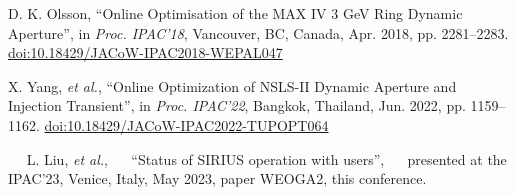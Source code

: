 \documentclass[a4paper,
               keeplastbox,   %
               ]{jacow}
\begin{document}
\begin{thebibliography}{9}
       D. K. Olsson,
       \textquotedblleft{Online Optimisation of the MAX IV 3 GeV Ring Dynamic Aperture}\textquotedblright,
       in \emph{Proc. IPAC'18}, Vancouver, BC, Canada, Apr. 2018, pp. 2281--2283.
       \url{doi:10.18429/JACoW-IPAC2018-WEPAL047}
    
        X. Yang, \emph{et al.},
       \textquotedblleft{Online Optimization of NSLS-II Dynamic Aperture and Injection Transient}\textquotedblright,
        in \emph{Proc. IPAC'22}, Bangkok, Thailand, Jun. 2022, pp. 1159--1162.
       \url{doi:10.18429/JACoW-IPAC2022-TUPOPT064}

       L. Liu, \emph{et al.},
       \textquotedblleft{Status of SIRIUS operation with users}\textquotedblright,
       presented at the IPAC’23, Venice, Italy, May 2023, paper WEOGA2, this conference. 
    
   
	\end{thebibliography}

%
% 

%
\end{document}
